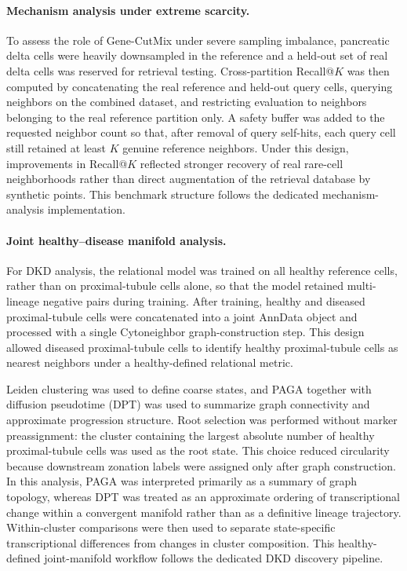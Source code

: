 \documentclass[11pt]{article}
\begin{document}
\paragraph{Mechanism analysis under extreme scarcity.}
To assess the role of Gene-CutMix under severe sampling imbalance, pancreatic delta cells were heavily downsampled in the reference and a held-out set of real delta cells was reserved for retrieval testing. Cross-partition Recall@$K$ was then computed by concatenating the real reference and held-out query cells, querying neighbors on the combined dataset, and restricting evaluation to neighbors belonging to the real reference partition only. A safety buffer was added to the requested neighbor count so that, after removal of query self-hits, each query cell still retained at least $K$ genuine reference neighbors. Under this design, improvements in Recall@$K$ reflected stronger recovery of real rare-cell neighborhoods rather than direct augmentation of the retrieval database by synthetic points. This benchmark structure follows the dedicated mechanism-analysis implementation.

\paragraph{Joint healthy--disease manifold analysis.}
For DKD analysis, the relational model was trained on all healthy reference cells, rather than on proximal-tubule cells alone, so that the model retained multi-lineage negative pairs during training. After training, healthy and diseased proximal-tubule cells were concatenated into a joint AnnData object and processed with a single Cytoneighbor graph-construction step. This design allowed diseased proximal-tubule cells to identify healthy proximal-tubule cells as nearest neighbors under a healthy-defined relational metric.

Leiden clustering was used to define coarse states, and PAGA together with diffusion pseudotime (DPT) was used to summarize graph connectivity and approximate progression structure\cite{Traag2019Leiden,Wolf2019PAGA,Haghverdi2016DPT}. Root selection was performed without marker preassignment: the cluster containing the largest absolute number of healthy proximal-tubule cells was used as the root state. This choice reduced circularity because downstream zonation labels were assigned only after graph construction. In this analysis, PAGA was interpreted primarily as a summary of graph topology, whereas DPT was treated as an approximate ordering of transcriptional change within a convergent manifold rather than as a definitive lineage trajectory. Within-cluster comparisons were then used to separate state-specific transcriptional differences from changes in cluster composition. This healthy-defined joint-manifold workflow follows the dedicated DKD discovery pipeline.
\end{document}
